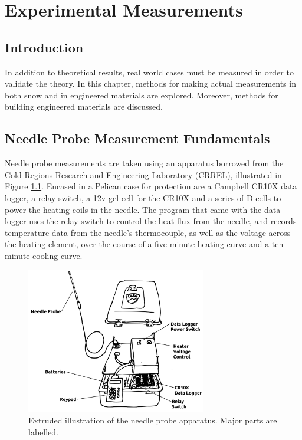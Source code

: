 \chapter{Experimental Measurements}
\label{sec:irl}

\section{Introduction}

In addition to theoretical results, real world cases must be measured
in order to validate the theory. In this chapter, methods for making actual
measurements in both snow and in engineered materials are explored. Moreover,
methods for building engineered materials are discussed.


\section{Needle Probe Measurement Fundamentals}

Needle probe measurements are taken using an apparatus borrowed from the Cold
Regions Research and Engineering Laboratory (CRREL), illustrated in Figure
\ref{fig:apparatus}. Encased in a Pelican case for protection are a Campbell
CR10X data logger, a relay switch, a 12v gel cell for the CR10X and a series of
D-cells to power the heating coils in the needle. The program that came with the
data logger uses the relay switch to control the heat flux from the needle, and
records temperature data from the needle's thermocouple, as well as the voltage
across the heating element, over the course of a five minute heating curve and
a ten minute cooling curve.

\begin{figure}[h]
\centering
\includegraphics[width=0.7\textwidth]{fig/apparatus.png}
\caption{Extruded illustration of the needle probe apparatus. Major parts are labelled.}
\label{fig:apparatus}
\end{figure}


